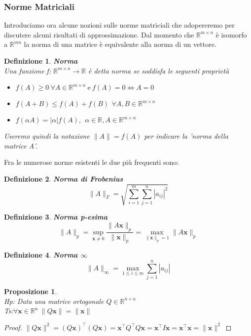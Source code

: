 \documentclass[11pt]{article}
\newtheorem{proposition}{Proposizione}
\newtheorem{definition}{Definizione}
\newcommand{\R}{\mathbb{R}} %
\begin{document}
\subsubsection{Norme Matriciali}
Introduciamo ora alcune nozioni sulle norme matriciali che adopereremo per discutere alcuni risultati di approssimazione.
Dal momento che $\R^{m \times n}$ è isomorfo a $\R^{mn}$ la norma di una matrice è equivalente alla norma di un vettore. 
\begin{definition}
	\textbf{Norma}\\ Una funzione f: $\R^{m \times n} \rightarrow \R$ è detta norma se soddisfa le seguenti proprietà
	\begin{itemize}
		\item $f(A) \geq 0 \ \forall A\in \R^{m \times n} \ \text{e} \  f(A)=0 \iff A=0 $
		\item $f(A+B)\leq f(A)+f(B)\  \, \forall A,B \in \R^{m \times n}$ 
		\item $f(\alpha A)=|\alpha|f(A), \ \ \alpha \in \R, A \in \R^{m \times n}$
	\end{itemize}
Useremo quindi la notazione $\|A\|=f(A)$ per indicare la 'norma della matrice A'. 
\end{definition}
\noindent 
Fra le numerose norme esistenti le due più frequenti sono:
\begin{definition}
\textbf{Norma di Frobenius}\\
$$\|A\|_F=\sqrt{\sum_{i=1}^m\sum_{j=1}^n|a_{ij}|^2}$$
\end{definition}
\begin{definition}
\textbf{Norma p-esima}\\
$$ \|A\|_p = \sup_{\mathbf{x} \neq 0} \frac{\|A\mathbf{x}\|_p}{\|\mathbf{x}\|_p}=\max_{\|\mathbf{x}\|_p =1} \|A\mathbf{x}\|_p
$$
\end{definition}
\begin{definition}
\textbf{Norma $\infty$}\\
$$\|A\|_\infty = \max_{1 \leq i \leq m} \sum_{j=1}^{n} |a_{ij}|$$
\end{definition}
\begin{proposition}\label{cons norm}
\textbf{}\\
\textit{Hp:} Data una matrice ortogonale $Q \in \R^{n \times n}$\\
\textit{Ts:$\forall \mathbf{x}\in \R^n \ \|Q\mathbf{x}\|=\|\mathbf{x}\|$} 
\end{proposition}
\begin{proof} $\|Q\mathbf{x}\|^2 = (Q \mathbf{x})^\top      (Q \mathbf{x}) = \mathbf{x}^\top       Q^\top       Q \mathbf{x} = \mathbf{x}^\top      I\mathbf{x} = \mathbf{x}^\top      \mathbf{x} = \|\mathbf{x}\|^2$
\end{proof}
\end{document}
